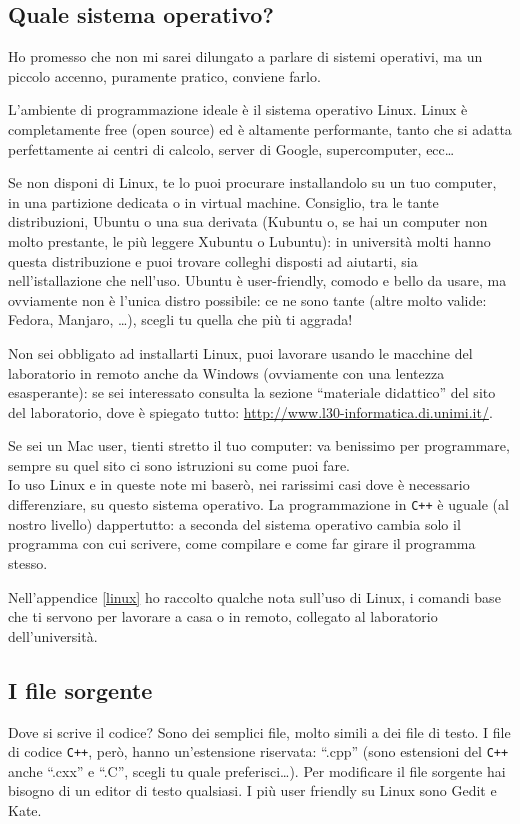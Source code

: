 \subsection{Quale sistema operativo?}
Ho promesso che non mi sarei dilungato a parlare di sistemi operativi, ma un piccolo accenno, puramente pratico, conviene farlo. 

L'ambiente di programmazione ideale è il sistema operativo Linux. Linux è completamente free (open source) ed è altamente performante, tanto che si adatta perfettamente ai centri di calcolo, server di Google, supercomputer, ecc\ldots 

Se non disponi di Linux, te lo puoi procurare installandolo su un tuo computer, in una partizione dedicata o in virtual machine. Consiglio, tra le tante distribuzioni, Ubuntu o una sua derivata (Kubuntu o, se hai un computer non molto prestante, le più leggere Xubuntu o Lubuntu): in università molti hanno questa distribuzione e puoi trovare colleghi disposti ad aiutarti, sia nell'istallazione che nell'uso. Ubuntu è user-friendly, comodo e bello da usare, ma ovviamente non è l'unica distro possibile: ce ne sono tante (altre molto valide: Fedora, Manjaro, \ldots), scegli tu quella che più ti aggrada!

Non sei obbligato ad installarti Linux, puoi lavorare usando le macchine del laboratorio in remoto anche da Windows (ovviamente con una lentezza esasperante): se sei interessato consulta la sezione ``materiale didattico'' del sito del laboratorio, dove è spiegato tutto: \url{http://www.l30-informatica.di.unimi.it/}. 

Se sei un Mac user, tienti stretto il tuo computer: va benissimo per programmare, sempre su quel sito ci sono istruzioni su come puoi fare.\\

Io uso Linux e in queste note mi baserò, nei rarissimi casi dove è necessario differenziare, su questo sistema operativo. La programmazione in \verb|C++| è uguale (al nostro livello) dappertutto: a seconda del sistema operativo cambia solo il programma con cui scrivere, come compilare e come far girare il programma stesso. 

Nell'appendice \ref{linux} ho raccolto qualche nota sull'uso di Linux, i comandi base che ti servono per lavorare a casa o in remoto, collegato al laboratorio dell'università.
\subsection{I file sorgente}
Dove si scrive il codice? Sono dei semplici file, molto simili a dei file di testo. I file di codice \verb|C++|, però, hanno un'estensione riservata: ``.cpp'' (sono estensioni del \verb|C++| anche ``.cxx'' e ``.C'', scegli tu quale preferisci\ldots). Per modificare il file sorgente hai bisogno di un editor di testo qualsiasi. I più user friendly su Linux sono Gedit e Kate. 

